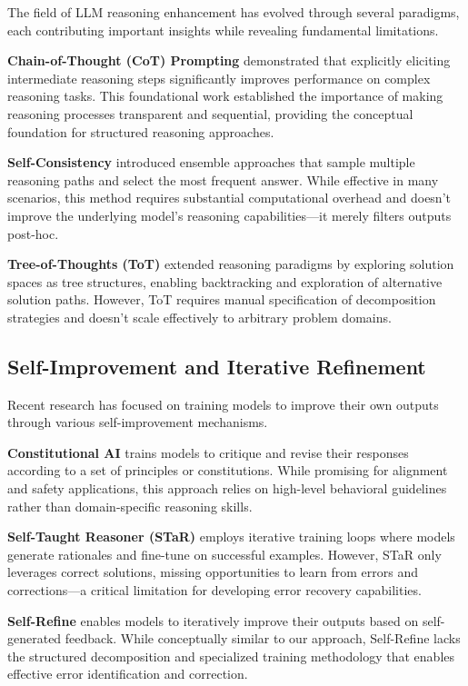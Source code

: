\documentclass[10pt,twocolumn]{article}
\begin{document}
The field of LLM reasoning enhancement has evolved through several paradigms, each contributing important insights while revealing fundamental limitations.

\textbf{Chain-of-Thought (CoT) Prompting} demonstrated that explicitly eliciting intermediate reasoning steps significantly improves performance on complex reasoning tasks. This foundational work established the importance of making reasoning processes transparent and sequential, providing the conceptual foundation for structured reasoning approaches.

\textbf{Self-Consistency} introduced ensemble approaches that sample multiple reasoning paths and select the most frequent answer. While effective in many scenarios, this method requires substantial computational overhead and doesn't improve the underlying model's reasoning capabilities—it merely filters outputs post-hoc.

\textbf{Tree-of-Thoughts (ToT)} extended reasoning paradigms by exploring solution spaces as tree structures, enabling backtracking and exploration of alternative solution paths. However, ToT requires manual specification of decomposition strategies and doesn't scale effectively to arbitrary problem domains.

\subsection{Self-Improvement and Iterative Refinement}

Recent research has focused on training models to improve their own outputs through various self-improvement mechanisms.

\textbf{Constitutional AI} trains models to critique and revise their responses according to a set of principles or constitutions. While promising for alignment and safety applications, this approach relies on high-level behavioral guidelines rather than domain-specific reasoning skills.

\textbf{Self-Taught Reasoner (STaR)} employs iterative training loops where models generate rationales and fine-tune on successful examples. However, STaR only leverages correct solutions, missing opportunities to learn from errors and corrections—a critical limitation for developing error recovery capabilities.

\textbf{Self-Refine} enables models to iteratively improve their outputs based on self-generated feedback. While conceptually similar to our approach, Self-Refine lacks the structured decomposition and specialized training methodology that enables effective error identification and correction.
\end{document}
